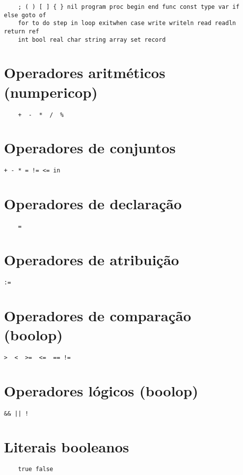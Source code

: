 \begin{verbatim}
    ; ( ) [ ] { } nil program proc begin end func const type var if else goto of
    for to do step in loop exitwhen case write writeln read readln return ref
    int bool real char string array set record
\end{verbatim}
\section{Operadores aritméticos (numpericop)}
\begin{verbatim}
    +  -  *  /  % 
\end{verbatim}

\section{Operadores de conjuntos}
\begin{Verbatim}[commandchars=\\\{\}]
    + - * = != <= in
\end{Verbatim}

\section{Operadores de declaração}
\begin{verbatim}
    =
\end{verbatim}

\section{Operadores de atribuição}
\begin{Verbatim}[commandchars=\\\{\}]
    :=
\end{Verbatim}

\section{Operadores de comparação (boolop)}
\begin{Verbatim}[commandchars=\\\{\}]
    >  <  >=  <=  == !=
\end{Verbatim}

\section{Operadores lógicos (boolop)}
\begin{Verbatim}[commandchars=\\\{\}]
    && || !
\end{Verbatim}

\section{Literais booleanos}
\begin{verbatim}
    true false
\end{verbatim}